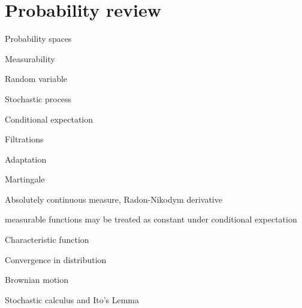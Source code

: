 

\section{Probability review}

Probability spaces

Measurability

Random variable

Stochastic process

Conditional expectation

Filtrations

Adaptation

Martingale

Absolutely continuous measure, Radon-Nikodym derivative

measurable functions may be treated as constant under conditional expectation

Characteristic function

Convergence in distribution

Brownian motion

Stochastic calculus and Ito's Lemma

